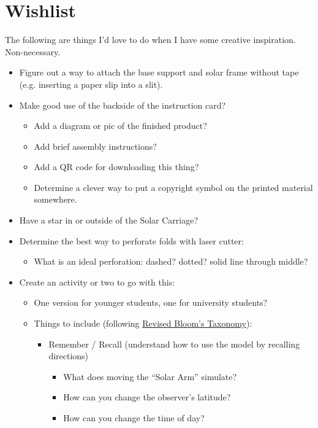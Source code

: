 \documentclass[tikz]{article}
\begin{document}
	\section*{Wishlist}
	The following are things I'd love to do when I have some creative inspiration. Non-necessary. 
	\begin{itemize}
		\item Figure out a way to attach the base support and solar frame without tape (e.g. inserting a paper slip into a slit). 
		\item Make good use of the backside of the instruction card? 
		\begin{itemize}
			\item Add a diagram or pic of the finished product?
			\item Add brief assembly instructions?
			\item Add a QR code for downloading this thing? 
			\item Determine a clever way to put a copyright symbol on the printed material somewhere. 
		\end{itemize}
		\item Have a star in or outside of the Solar Carriage?
		\item Determine the best way to perforate folds with laser cutter: 
		\begin{itemize}
			\item What is an ideal perforation: dashed? dotted? solid line through middle?
		\end{itemize}
		\item Create an activity or two to go with this: 
		\begin{itemize}
			\item One version for younger students, one for university students?
			\item Things to include (following \href{https://cft.vanderbilt.edu/guides-sub-pages/blooms-taxonomy/}{Revised Bloom's Taxonomy}): 
			\begin{itemize}
				\item Remember / Recall (understand how to use the model by recalling directions)
				\begin{itemize}
					\item What does moving the ``Solar Arm'' simulate?
					\item How can you change the observer's latitude? 
					\item How can you change the time of day? 

\end{itemize}
\end{itemize}
\end{itemize}
\end{itemize}
\end{document}
